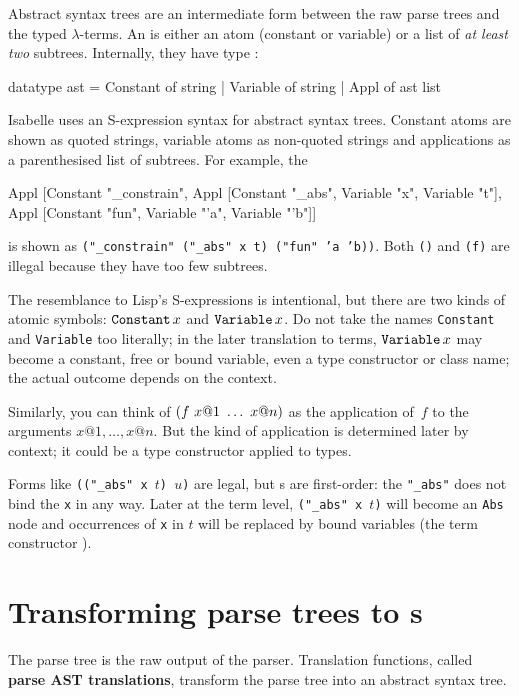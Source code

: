 Abstract syntax trees are an intermediate form between the raw parse trees
and the typed $\lambda$-terms.  An \AST{} is either an atom (constant or
variable) or a list of {\em at least two\/} subtrees.  Internally, they
have type :  
\begin{ttbox}
datatype ast = Constant of string
             | Variable of string
             | Appl of ast list
\end{ttbox}
%
Isabelle uses an S-expression syntax for abstract syntax trees.  Constant
atoms are shown as quoted strings, variable atoms as non-quoted strings and
applications as a parenthesised list of subtrees.  For example, the \AST
\begin{ttbox}
Appl [Constant "_constrain",
      Appl [Constant "_abs", Variable "x", Variable "t"],
      Appl [Constant "fun", Variable "'a", Variable "'b"]]
\end{ttbox}
is shown as {\tt ("_constrain" ("_abs" x t) ("fun" 'a 'b))}.
Both {\tt ()} and {\tt (f)} are illegal because they have too few
subtrees.

The resemblance to Lisp's S-expressions is intentional, but there are two
kinds of atomic symbols: $\mathop{\mbox{\tt Constant}}\nolimits x$ and $\mathop{\mbox{\tt Variable}}\nolimits x$.  Do not take the
names {\tt Constant} and {\tt Variable} too literally; in the later
translation to terms, $\mathop{\mbox{\tt Variable}}\nolimits x$ may become a constant, free or bound
variable, even a type constructor or class name; the actual outcome depends
on the context.

Similarly, you can think of ${\tt (} f~x@1~\ldots~x@n{\tt )}$ as the
application of~$f$ to the arguments $x@1, \ldots, x@n$.  But the kind of
application is determined later by context; it could be a type constructor
applied to types.

Forms like {\tt (("_abs" x $t$) $u$)} are legal, but \AST{}s are
first-order: the {\tt "_abs"} does not bind the {\tt x} in any way.  Later
at the term level, {\tt ("_abs" x $t$)} will become an {\tt Abs} node and
occurrences of {\tt x} in $t$ will be replaced by bound variables (the term
constructor ).


\section{Transforming parse trees to \AST{}s}\label{sec:astofpt}
\newcommand\astofpt[1]{\lbrakk#1\rbrakk}

The parse tree is the raw output of the parser.  Translation functions,
called {\bf parse AST translations},
transform the parse tree into an abstract syntax tree.

